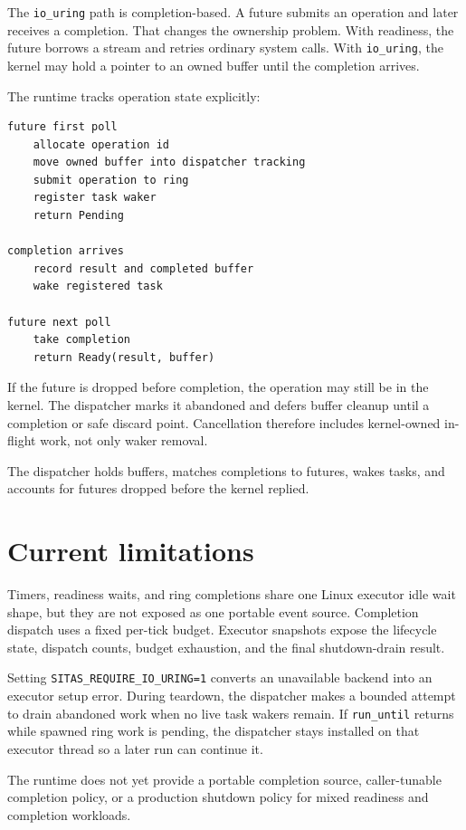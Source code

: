 The \texttt{io\_uring} path is completion-based. A future submits an operation
and later receives a completion. That changes the ownership problem. With
readiness, the future borrows a stream and retries ordinary system calls. With
\texttt{io\_uring}, the kernel may hold a pointer to an owned buffer until the
completion arrives.

The runtime tracks operation state explicitly:

\begin{lstlisting}[language={},caption={Simplified completion lifecycle}]
future first poll
    allocate operation id
    move owned buffer into dispatcher tracking
    submit operation to ring
    register task waker
    return Pending

completion arrives
    record result and completed buffer
    wake registered task

future next poll
    take completion
    return Ready(result, buffer)
\end{lstlisting}

If the future is dropped before completion, the operation may still be in the
kernel. The dispatcher marks it abandoned and defers buffer cleanup until a
completion or safe discard point. Cancellation therefore includes
kernel-owned in-flight work, not only waker removal.

The dispatcher holds buffers, matches completions to futures, wakes tasks, and
accounts for futures dropped before the kernel replied.

\section{Current limitations}

Timers, readiness waits, and ring completions share one Linux executor idle
wait shape, but they are not exposed as one portable event source. Completion
dispatch uses a fixed per-tick budget. Executor snapshots expose the lifecycle
state, dispatch counts, budget exhaustion, and the final shutdown-drain result.

Setting \texttt{SITAS\_REQUIRE\_IO\_URING=1} converts an unavailable backend
into an executor setup error. During teardown, the dispatcher makes a bounded
attempt to drain abandoned work when no live task wakers remain. If
\texttt{run\_until} returns while spawned ring work is pending, the dispatcher
stays installed on that executor thread so a later run can continue it.

The runtime does not yet provide a portable completion source, caller-tunable
completion policy, or a production shutdown policy for mixed readiness and
completion workloads.

